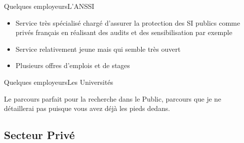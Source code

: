 \documentclass{beamer}
\begin{document}
{ 
\begin{frame}{Quelques employeurs}{L'ANSSI}

    \begin{itemize}
        \item Service très spécialisé chargé d'assurer la protection des SI publics comme privés français en réalisant des audits et des sensibilisation par exemple
        \item Service relativement jeune mais qui semble très ouvert
        \item Plusieurs offres d'emplois et de stages
        
    \end{itemize}
    
\end{frame}
}

\begin{frame}{Quelques employeurs}{Les Universités}

Le parcours parfait pour la recherche dans le Public, parcours que je ne détaillerai pas puisque vous avez déjà les pieds dedans.

\end{frame}

\subsection{Secteur Privé}
\end{document}
